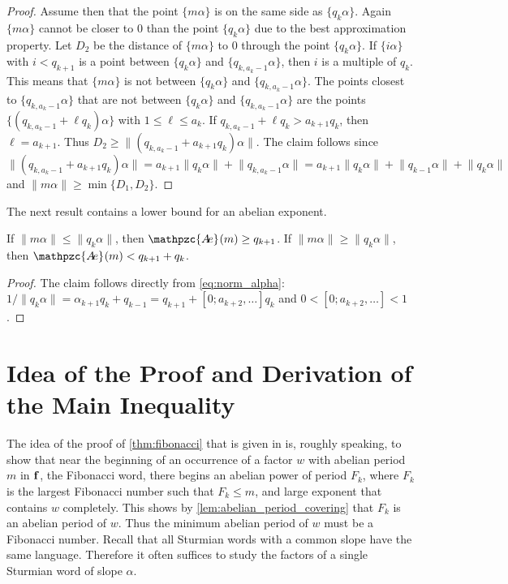 \documentclass[a4paper,fleqn]{article}
\providecommand{\norm}[1]{\lVert#1\rVert}
\newcommand{\infw}[1]{%
  \ifcat\noexpand#1\relax\bm{#1}%
  \else\mathbf{#1}\fi}          %
\newcommand{\abexp}[2][]{\mathpzc{A\mkern-3mu e}_{#1}(#2)}
\begin{document}
\begin{proof}
    Assume then that the point $\{m\alpha\}$ is on the same side as $\{q_k\alpha\}$. Again $\{m\alpha\}$ cannot be
    closer to $0$ than the point $\{q_k\alpha\}$ due to the best approximation property. Let $D_2$ be the distance of
    $\{m\alpha\}$ to $0$ through the point $\{q_k\alpha\}$. If $\{i\alpha\}$ with $i < q_{k+1}$ is a point between
    $\{q_k\alpha\}$ and $\{q_{k,a_k-1}\alpha\}$, then $i$ is a multiple of $q_k$. This means that $\{m\alpha\}$ is not
    between $\{q_k\alpha\}$ and $\{q_{k,a_k-1}\alpha\}$. The points closest to $\{q_{k,a_k-1}\alpha\}$ that are not
    between $\{q_k\alpha\}$ and $\{q_{k,a_k-1}\alpha\}$ are the points $\{(q_{k,a_k-1} + \ell q_k)\alpha\}$ with
    $1 \leq \ell \leq a_k$. If $q_{k,a_k-1} + \ell q_k > a_{k+1}q_k$, then $\ell = a_{k+1}$. Thus
    $D_2 \geq \norm{(q_{k,a_k-1} + a_{k+1} q_k)\alpha}$. The claim follows since
    \begin{equation*}
      \norm{(q_{k,a_k-1} + a_{k+1} q_k)\alpha} = a_{k+1}\norm{q_k\alpha} + \norm{q_{k,a_k-1}\alpha} = a_{k+1}\norm{q_k\alpha} + \norm{q_{k-1}\alpha} + \norm{q_k\alpha}
    \end{equation*}
    and $\norm{m\alpha} \geq \min\{D_1, D_2\}$.
  \end{proof}

  The next result contains a lower bound for an abelian exponent.

  \begin{lemma}\label{lem:exponent_lower_bound}
    If $\norm{m\alpha} \leq \norm{q_k\alpha}$, then $\abexp{m} \geq q_{k+1}$. If $\norm{m\alpha} \geq
    \norm{q_k\alpha}$, then $\abexp{m} < q_{k+1} + q_k$.
  \end{lemma}
  \begin{proof}
    The claim follows directly from \eqref{eq:norm_alpha}:
    $1/\norm{q_k\alpha} = \alpha_{k+1}q_k + q_{k-1} = q_{k+1} + [0; a_{k+2}, \ldots]q_k$ and
    $0 < [0; a_{k+2}, \ldots] < 1$.
  \end{proof}

  \section{Idea of the Proof and Derivation of the Main Inequality}\label{sec:main_inequality}
  The idea of the proof of \autoref{thm:fibonacci} that is given in
  \cite{2016:abelian_powers_and_repetitions_in_sturmian_words} is, roughly speaking, to show that near the beginning of
  an occurrence of a factor $w$ with abelian period $m$ in $\infw{f}$, the Fibonacci word, there begins an abelian
  power of period $F_k$, where $F_k$ is the largest Fibonacci number such that $F_k \leq m$, and large exponent that
  contains $w$ completely. This shows by \autoref{lem:abelian_period_covering} that $F_k$ is an abelian period of $w$.
  Thus the minimum abelian period of $w$ must be a Fibonacci number. Recall that all Sturmian words with a common slope
  have the same language. Therefore it often suffices to study the factors of a single Sturmian word of slope $\alpha$.
\end{document}
